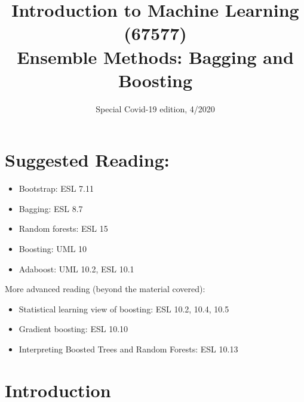 \documentclass[11pt]{article}
\title{{\large{Introduction to Machine Learning (67577) \\
\vphantom{} Ensemble Methods: Bagging and Boosting}}}
\date{Special Covid-19 edition, 4/2020}
\begin{document}
\maketitle

\tableofcontents

\section*{Suggested Reading:}
\begin{itemize}
  \item Bootstrap: ESL 7.11
  \item Bagging: ESL 8.7
  \item Random forests: ESL 15
  \item Boosting: UML 10
  \item Adaboost: UML 10.2, ESL 10.1

\end{itemize}

More advanced reading (beyond the material covered):
\begin{itemize}
  \item Statistical learning view of boosting: ESL 10.2, 10.4, 10.5
  \item Gradient boosting: ESL 10.10
  \item Interpreting Boosted Trees and Random Forests: ESL 10.13

\end{itemize}

\section{Introduction}
\end{document}
